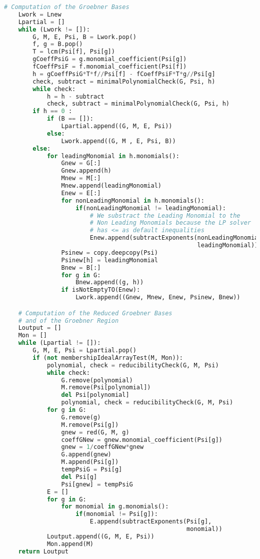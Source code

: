 \begin{lstlisting}[language=Python]
    # Computation of the Groebner Bases
    Lwork = Lnew
    Lpartial = []
    while (Lwork != []):
        G, M, E, Psi, B = Lwork.pop()
        f, g = B.pop()
        T = lcm(Psi[f], Psi[g])
        gCoeffPsiG = g.monomial_coefficient(Psi[g])
        fCoeffPsiF = f.monomial_coefficient(Psi[f])
        h = gCoeffPsiG*T*f//Psi[f] - fCoeffPsiF*T*g//Psi[g]
        check, subtract = minimalPolynomialCheck(G, Psi, h)
        while check:
            h = h - subtract
            check, subtract = minimalPolynomialCheck(G, Psi, h)
        if h == 0 :
            if (B == []):
                Lpartial.append((G, M, E, Psi))
            else:
                Lwork.append((G, M , E, Psi, B))
        else:
            for leadingMonomial in h.monomials():
                Gnew = G[:]
                Gnew.append(h)
                Mnew = M[:]
                Mnew.append(leadingMonomial)
                Enew = E[:]
                for nonLeadingMonomial in h.monomials():
                    if(nonLeadingMonomial != leadingMonomial):
                        # We substract the Leading Monomial to the
                        # Non Leading Monomials because the LP solver
                        # has <= as default inequalities
                        Enew.append(subtractExponents(nonLeadingMonomial,
                                                      leadingMonomial))
                Psinew = copy.deepcopy(Psi)
                Psinew[h] = leadingMonomial
                Bnew = B[:]
                for g in G:
                    Bnew.append((g, h))
                if isNotEmptyTO(Enew):
                    Lwork.append((Gnew, Mnew, Enew, Psinew, Bnew))

    # Computation of the Reduced Groebner Bases
    # and of the Groebner Region
    Loutput = []
    Mon = []
    while (Lpartial != []):
        G, M, E, Psi = Lpartial.pop()
        if (not membershipIdealArrayTest(M, Mon)):
            polynomial, check = reducibilityCheck(G, M, Psi)
            while check:
                G.remove(polynomial)
                M.remove(Psi[polynomial])
                del Psi[polynomial]
                polynomial, check = reducibilityCheck(G, M, Psi)
            for g in G:
                G.remove(g)
                M.remove(Psi[g])
                gnew = red(G, M, g)
                coeffGNew = gnew.monomial_coefficient(Psi[g])
                gnew = 1/coeffGNew*gnew
                G.append(gnew)
                M.append(Psi[g])
                tempPsiG = Psi[g]
                del Psi[g]
                Psi[gnew] = tempPsiG
            E = []
            for g in G:
                for monomial in g.monomials():
                    if(monomial != Psi[g]):
                        E.append(subtractExponents(Psi[g],
                                                   monomial))
            Loutput.append((G, M, E, Psi))
            Mon.append(M)
    return Loutput
\end{lstlisting}

